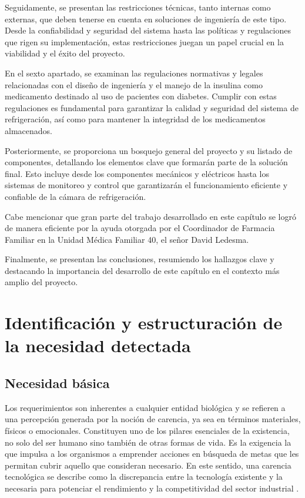 Seguidamente, se presentan las restricciones técnicas, tanto internas como externas, que deben tenerse en cuenta en soluciones de ingeniería de este tipo. Desde la confiabilidad y seguridad del sistema hasta las políticas y regulaciones que rigen su implementación, estas restricciones juegan un papel crucial en la viabilidad y el éxito del proyecto.

En el sexto apartado, se examinan las regulaciones normativas y legales relacionadas con el diseño de ingeniería y el manejo de la insulina como medicamento destinado al uso de pacientes con diabetes. Cumplir con estas regulaciones es fundamental para garantizar la calidad y seguridad del sistema de refrigeración, así como para mantener la integridad de los medicamentos almacenados.

Posteriormente, se proporciona un bosquejo general del proyecto y su listado de componentes, detallando los elementos clave que formarán parte de la solución final. Esto incluye desde los componentes mecánicos y eléctricos hasta los sistemas de monitoreo y control que garantizarán el funcionamiento eficiente y confiable de la cámara de refrigeración.

Cabe mencionar que gran parte del trabajo desarrollado en este capítulo se logró de manera eficiente por la ayuda otorgada por el Coordinador de Farmacia Familiar en la Unidad Médica Familiar 40, el señor David Ledesma.

Finalmente, se presentan las conclusiones, resumiendo los hallazgos clave y destacando la importancia del desarrollo de este capítulo en el contexto más amplio del proyecto. \rsp
\newpage


\section{Identificación y estructuración de la necesidad detectada}\rsp
\subsection{Necesidad básica}\rsp{}
Los requerimientos son inherentes a cualquier entidad biológica y se refieren a una percepción generada por la noción de carencia, ya sea en términos materiales, físicos o emocionales. Constituyen uno de los pilares esenciales de la existencia, no solo del ser humano sino también de otras formas de vida. Es la exigencia la que impulsa a los organismos a emprender acciones en búsqueda de metas que les permitan cubrir aquello que consideran necesario.
En este sentido, una carencia tecnológica se describe como la discrepancia entre la tecnología existente y la necesaria para potenciar el rendimiento y la competitividad del sector industrial \cite{marrelli-2011,imp-2018}.

